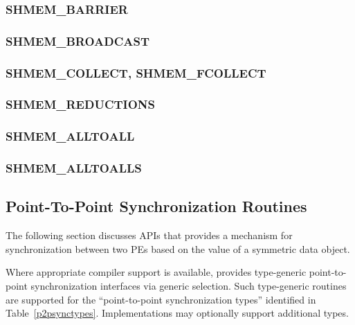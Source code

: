 \documentclass[10pt]{book}
\begin{document}
\subsubsection{\textbf{SHMEM\_BARRIER}}\label{subsec:shmem_barrier}


\subsubsection{\textbf{SHMEM\_BROADCAST}}\label{subsec:shmem_broadcast}


\subsubsection{\textbf{SHMEM\_COLLECT, SHMEM\_FCOLLECT}}\label{subsec:shmem_collect}


\subsubsection{\textbf{SHMEM\_REDUCTIONS}}\label{subsec:shmem_reductions}


\subsubsection{\textbf{SHMEM\_ALLTOALL}}\label{subsec:shmem_alltoall}


\subsubsection{\textbf{SHMEM\_ALLTOALLS}}\label{subsec:shmem_alltoalls}






\subsection{Point-To-Point Synchronization Routines}
The following section discusses \openshmem \ac{API}s that provides a mechanism
for synchronization between two \ac{PE}s based on the value of a symmetric data
object. 

Where appropriate compiler support is available, \openshmem provides
type-generic point-to-point synchronization interfaces via \Celev{} generic
selection. Such type-generic routines are supported for the
``point-to-point synchronization types'' identified in
Table~\ref{p2psynctypes}. Implementations may optionally support additional
types.
\end{document}
